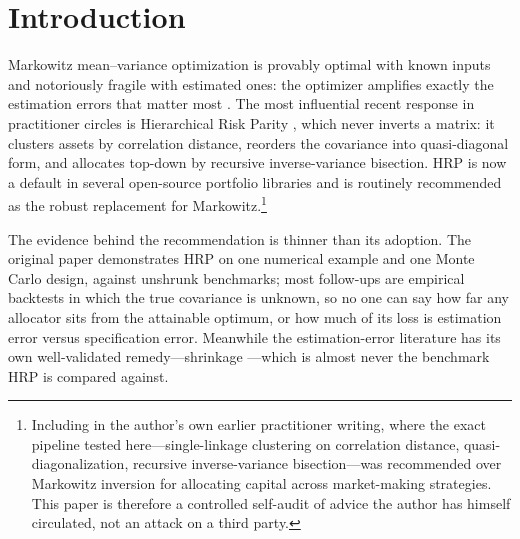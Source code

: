 \documentclass[11pt]{article}
\newcommand{\TN}{T/N}
\begin{document}
\begin{abstract}
tightness (rising $0.35\to0.56$ across dispersion terciles of our
hierarchical worlds), in the data-rich band it edges IV more broadly (win
rates $0.46$--$0.63$ at $\TN\ge5$), and the much-debated linkage choice is
immaterial (the three linkage medians agree to within $0.02$--$0.06$). (v)~Estimated \emph{means}, not estimated
covariances, remain the real catastrophe: tangency portfolios built from
estimated means capture a median $10\%$ of the oracle Sharpe ratio at
$\TN\le1$ and are negative $28\%$ of the time. The Student-$t$ batch leaves
every qualitative ranking unchanged. Practical reading: HRP is real
insurance against inverting a noisy covariance matrix when the correlation
structure is unknown and data are scarce---but if you can shrink, shrinking
is better almost everywhere.
\end{abstract}

\section{Introduction}

Markowitz mean--variance optimization \citep{markowitz1952portfolio} is
provably optimal with known inputs and notoriously fragile with estimated
ones: the optimizer amplifies exactly the estimation errors that matter most
\citep{michaud1989markowitz,best1991sensitivity,chopra1993effect}. The most
influential recent response in practitioner circles is Hierarchical Risk
Parity \citep[HRP;][]{lopezdeprado2016building}, which never inverts a
matrix: it clusters assets by correlation distance, reorders the covariance
into quasi-diagonal form, and allocates top-down by recursive
inverse-variance bisection. HRP is now a default in several open-source
portfolio libraries and is routinely recommended as the robust replacement
for Markowitz.\footnote{Including in the author's own earlier practitioner
writing, where the exact pipeline tested here---single-linkage clustering on
correlation distance, quasi-diagonalization, recursive inverse-variance
bisection---was recommended over Markowitz inversion for allocating capital
across market-making strategies. This paper is therefore a controlled
self-audit of advice the author has himself circulated, not an attack on a
third party.}

The evidence behind the recommendation is thinner than its adoption. The
original paper demonstrates HRP on one numerical example and one Monte Carlo
design, against unshrunk benchmarks; most follow-ups are empirical backtests
in which the true covariance is unknown, so no one can say how far any
allocator sits from the attainable optimum, or how much of its loss is
estimation error versus specification error. Meanwhile the estimation-error
literature has its own well-validated remedy---shrinkage
\citep{ledoit2003improved,ledoit2004well,ledoit2004honey}---which is almost
never the benchmark HRP is compared against.
\end{document}
